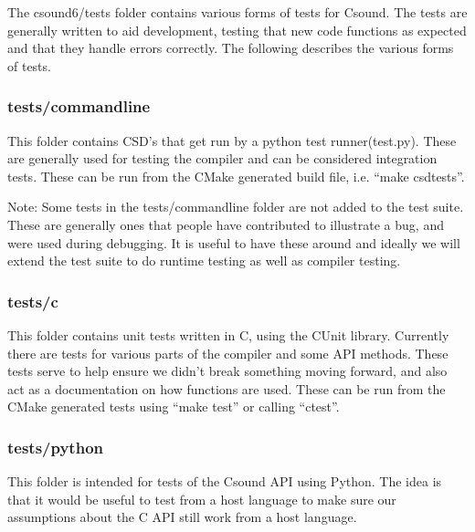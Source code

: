 The csound6/tests folder contains various forms of tests for Csound. The
tests are generally written to aid development, testing that new code
functions as expected and that they handle errors correctly. The
following describes the various forms of tests.

\subsubsection{tests/commandline}

This folder contains CSD's that get run by a python test
runner(test.py). These are generally used for testing the compiler and
can be considered integration tests. These can be run from the CMake
generated build file, i.e. ``make csdtests''.

Note: Some tests in the tests/commandline folder are not added to the
test suite. These are generally ones that people have contributed to
illustrate a bug, and were used during debugging. It is useful to have
these around and ideally we will extend the test suite to do runtime
testing as well as compiler testing.

\subsubsection{tests/c}

This folder contains unit tests written in C, using the CUnit library.
Currently there are tests for various parts of the compiler and some API
methods. These tests serve to help ensure we didn't break something
moving forward, and also act as a documentation on how functions are
used. These can be run from the CMake generated tests using ``make
test'' or calling ``ctest''.

\subsubsection{tests/python}

This folder is intended for tests of the Csound API using Python. The
idea is that it would be useful to test from a host language to make
sure our assumptions about the C API still work from a host language.
